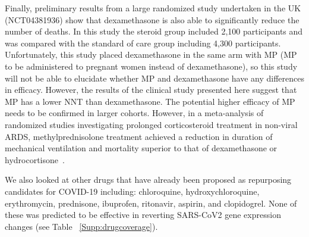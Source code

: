 Finally, preliminary results from a large randomized study undertaken in the UK \\(NCT04381936) show that dexamethasone is also able to significantly reduce the number of deaths. In this study the steroid group included 2,100 participants and was compared with the standard of care group including 4,300 participants. Unfortunately, this study placed dexamethasone in the same arm with MP (MP to be administered to pregnant women instead of dexamethasone), so this study will not be able to elucidate whether MP and dexamethasone have any differences in efficacy. However, the results of the clinical study presented here suggest that MP has a lower NNT than dexamethasone. The potential higher efficacy of MP needs to be confirmed in larger cohorts. However, in a meta-analysis of randomized studies investigating prolonged corticosteroid treatment in non-viral ARDS, methylprednisolone treatment achieved a reduction in duration of mechanical ventilation and mortality superior to that of dexamethasone or hydrocortisone~\cite{meduri2020pharmacological}.

We also looked at other drugs that have already been proposed as repurposing candidates for COVID-19 including: chloroquine, hydroxychloroquine, erythromycin, prednisone, ibuprofen, ritonavir, aspirin, and clopidogrel. None of these was predicted to be effective in reverting SARS-CoV2 gene expression changes (see Table ~\ref{Supp:drugcoverage}).

